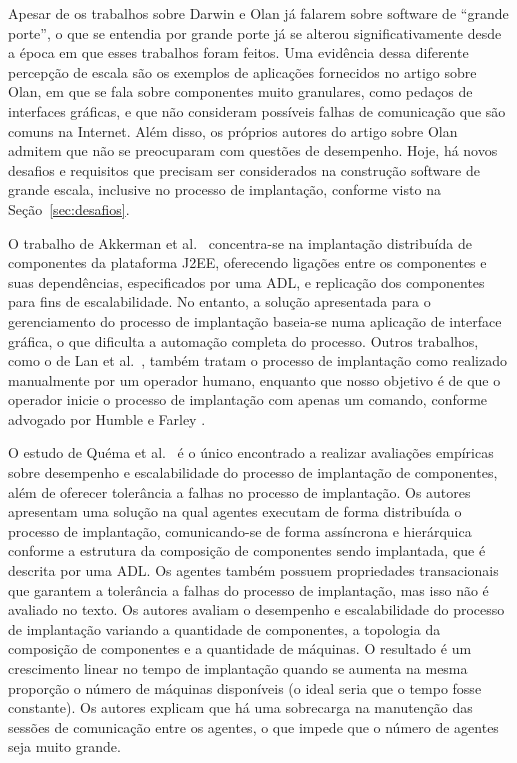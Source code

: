 Apesar de os trabalhos sobre Darwin e Olan já falarem sobre software de ``grande porte'', o que se entendia por grande porte já se alterou significativamente desde a época em que esses trabalhos foram feitos. Uma evidência dessa diferente percepção de escala são os exemplos de aplicações fornecidos no artigo sobre Olan, em que se fala sobre componentes muito granulares, como pedaços de interfaces gráficas, e que não consideram possíveis falhas de comunicação que são comuns na Internet. Além disso, os próprios autores do artigo sobre Olan admitem que não se preocuparam com questões de desempenho. 
Hoje, há novos  desafios e requisitos que precisam ser considerados na construção software de grande escala, inclusive no processo de implantação, conforme visto na Seção~\ref{sec:desafios}.

O trabalho de Akkerman et al.~\cite{Akkerman2005J2EE} concentra-se na implantação distribuída de componentes da plataforma J2EE, oferecendo ligações entre os componentes e suas dependências, especificados por uma ADL, e replicação dos componentes para fins de escalabilidade. No entanto, a solução apresentada para o gerenciamento do processo de implantação baseia-se numa aplicação de interface gráfica, o que dificulta a automação completa do processo. Outros trabalhos, como o de Lan et al.~\cite{Lan2005Architecture}, também tratam o processo de implantação como realizado manualmente por um operador humano, enquanto que nosso objetivo é de que o operador inicie o processo de implantação com apenas um comando, conforme advogado por Humble e Farley \cite{Humble2011Continuous}.

O estudo de Quéma et al.~\cite{quema2004hierarchical} é o único encontrado a realizar avaliações empíricas sobre desempenho e escalabilidade do processo de implantação de componentes, além de oferecer tolerância a falhas no processo de implantação. Os autores apresentam uma solução na qual agentes executam de forma distribuída o processo de implantação, comunicando-se de forma assíncrona e hierárquica conforme a estrutura da composição de componentes sendo implantada, que é descrita por uma ADL. Os agentes também possuem propriedades transacionais que garantem a tolerância a falhas do processo de implantação, mas isso não é avaliado no texto. 
Os autores avaliam o desempenho e escalabilidade do processo de implantação variando a quantidade de componentes, a topologia da composição de componentes e a quantidade de máquinas. O resultado é um crescimento linear no tempo de implantação quando se aumenta na mesma proporção o número de máquinas disponíveis (o ideal seria que o tempo fosse constante). Os autores explicam que há uma sobrecarga na manutenção das sessões de comunicação entre os agentes, o que impede que o número de agentes seja muito grande. 

